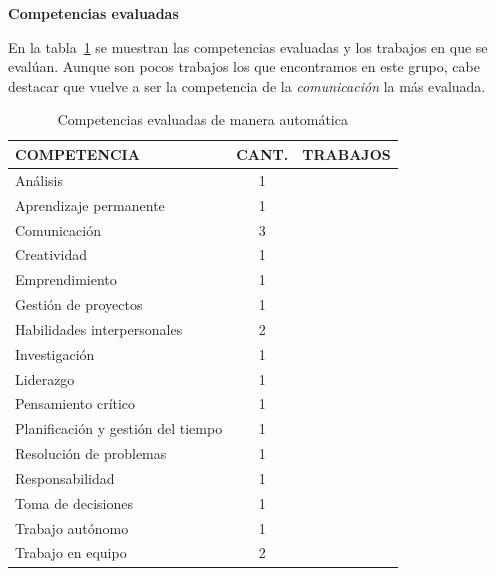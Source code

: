 \bigskip
\textbf{Competencias evaluadas}
\bigskip

 En la tabla~\ref{tab:CompetenciasAutomaticas} se muestran las competencias evaluadas y los trabajos en que se evalúan. Aunque son pocos trabajos los que encontramos en este grupo, cabe destacar que vuelve a ser la competencia de la \emph{comunicación} la más evaluada.

\begin{table}
  \begin{center}
  \begin{tabular}{| m{6cm} | c | m{5cm} |}
    \hline
    COMPETENCIA & CANT. & TRABAJOS\\
    \hline
    \hline
    Análisis & 1 & \cite{andre2011formal} \\
    \hline
    Aprendizaje permanente & 1 & \cite{andre2011formal}   \\
    \hline
    Comunicación & 3 & \cite{andre2011formal,rayon2014web,bedek2011behavioral}  \\
    \hline
    Creatividad & 1 & \cite{andre2011formal}   \\
    \hline
    Emprendimiento & 1 & \cite{guenaga2013serious} \\
    \hline
    Gestión de proyectos & 1 & \cite{andre2011formal} \\
    \hline
    Habilidades interpersonales & 2 & \cite{andre2011formal,rayon2014web}  \\
    \hline
    Investigación & 1 & \cite{andre2011formal}  \\
    \hline
    Liderazgo & 1 & \cite{andre2011formal}  \\
    \hline
    Pensamiento crítico & 1 & \cite{andre2011formal} \\
    \hline
    Planificación y gestión del tiempo & 1 & \cite{andre2011formal} \\
    \hline
    Resolución de problemas & 1 & \cite{guenaga2013serious} \\
    \hline
    Responsabilidad & 1 & \cite{andre2011formal}  \\
    \hline 
    Toma de decisiones & 1 & \cite{andre2011formal}   \\
    \hline
    Trabajo autónomo & 1 & \cite{andre2011formal} \\
    \hline
    Trabajo en equipo & 2 & \cite{andre2011formal,fidalgo:2015}  \\
    \hline
  \end{tabular}
\end{center}
\caption{Competencias evaluadas de manera automática}
\label{tab:CompetenciasAutomaticas}
\end{table} 

